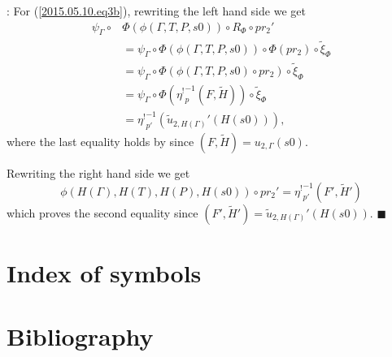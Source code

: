 \documentclass[12pt]{article}
\numberwithin{equation}{section}
\newenvironment{myproof}{{\bf Proof}:}{$\blacksquare$ \vskip 5mm }
\newcommand{\wt}{\widetilde}
\newcommand{\etashriek}{\eta^!}
\newcommand{\etaunshriek}{{\etashriek}^{-1}}
\begin{document}
\begin{myproof}
For (\ref{2015.05.10.eq3b}), rewriting the left hand side we get
%
\begin{align*}
  \psi_{\Gamma}\circ & \Phi(\phi(\Gamma,T,P,s0))\circ R_{\Phi}\circ pr_2'  \\
    & = \psi_{\Gamma}\circ \Phi(\phi(\Gamma,T,P,s0))\circ \Phi(pr_2)\circ \wt{\xi}_{\Phi} \\
    & = \psi_{\Gamma}\circ \Phi(\phi(\Gamma,T,P,s0)\circ pr_2)\circ \wt{\xi}_{\Phi} \\
    & = \psi_{\Gamma}\circ \Phi(\etaunshriek_p(F,\wt{H}))\circ \wt{\xi}_{\Phi} \\
    & = \etaunshriek_{p'}(\wt{u}_{2,H(\Gamma)}'(H(s0))),
\end{align*}
%
where the last equality holds by \cite[Lemma 6.2(2)]{fromunivwithPi} since
$(F,\wt{H})=u_{2,\Gamma}(s0)$.

Rewriting the right hand side we get
%
$$\phi(H(\Gamma),H(T),H(P),H(s0))\circ pr_2'=\etaunshriek_{p'}(F',\wt{H}')$$
%
which proves the second equality since
$(F',\wt{H}')=\wt{u}_{2,H(\Gamma)}'(H(s0))$.
\end{myproof}

\section{Index of symbols}
\printglossaries

\section{Bibliography}


\end{document}
